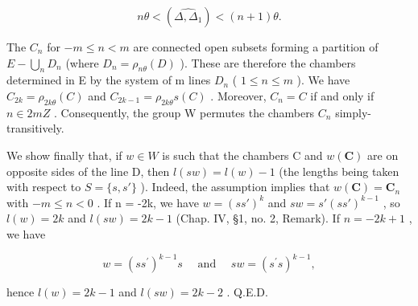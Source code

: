 \[
n \theta <   (\widehat {\Delta , \Delta_ {1}}) <   (n + 1) \theta .
\]

The \(C_{n}\) for \(-m \leqslant n < m\) are connected open subsets forming a partition of \(E - \bigcup_{n} D_{n}\) (where \(D_{n} = \rho_{n\theta}(D)\) ). These are therefore the chambers determined in E by the system of m lines \(D_{n}\) ( \(1 \leqslant n \leqslant m\) ). We have \(C_{2k} = \rho_{2k\theta}(C)\) and \(C_{2k-1} = \rho_{2k\theta}s(C)\) . Moreover, \(C_{n} = C\) if and only if \(n \in 2mZ\) . Consequently, the group W permutes the chambers \(C_{n}\) simply-transitively.

We show finally that, if \(w \in W\) is such that the chambers C and \(w(\mathbf{C})\) are on opposite sides of the line D, then \(l(sw) = l(w) - 1\) (the lengths being taken with respect to \(S = \{s, s'\}\) ). Indeed, the assumption implies that \(w(\mathbf{C}) = \mathbf{C}_n\) with \(-m \leqslant n < 0\) . If n = -2k, we have \(w = (ss')^k\) and \(sw = s'(ss')^{k-1}\) , so \(l(w) = 2k\) and \(l(sw) = 2k - 1\) (Chap. IV, §1, no. 2, Remark). If \(n = -2k + 1\) , we have

\[
w = \left(s s ^ {\prime}\right) ^ {k - 1} s \quad \text { and } \quad s w = \left(s ^ {\prime} s\right) ^ {k - 1},
\]

hence \(l(w) = 2k - 1\) and \(l(sw) = 2k - 2\) . Q.E.D.


